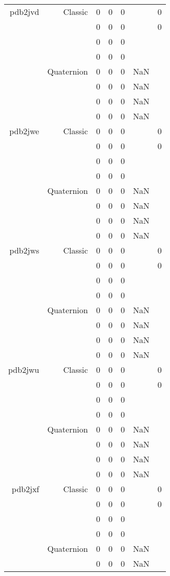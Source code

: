 \begin{xltabular}{\textwidth}{r|rcccSc}
pdb2jvd & Classic & 0 & 0 & 0 & & 0 \\
& & 0 & 0 & 0 & & 0 \\
& & 0 & 0 & 0 & & \\
& & 0 & 0 & 0 & & \\
& Quaternion & 0 & 0 & 0 & NaN & \\
& & 0 & 0 & 0 & NaN & \\
& & 0 & 0 & 0 & NaN & \\
& & 0 & 0 & 0 & NaN & \\ \addlinespace
pdb2jwe & Classic & 0 & 0 & 0 & & 0 \\
& & 0 & 0 & 0 & & 0 \\
& & 0 & 0 & 0 & & \\
& & 0 & 0 & 0 & & \\
& Quaternion & 0 & 0 & 0 & NaN & \\
& & 0 & 0 & 0 & NaN & \\
& & 0 & 0 & 0 & NaN & \\
& & 0 & 0 & 0 & NaN & \\ \addlinespace
pdb2jws & Classic & 0 & 0 & 0 & & 0 \\
& & 0 & 0 & 0 & & 0 \\
& & 0 & 0 & 0 & & \\
& & 0 & 0 & 0 & & \\
& Quaternion & 0 & 0 & 0 & NaN & \\
& & 0 & 0 & 0 & NaN & \\
& & 0 & 0 & 0 & NaN & \\
& & 0 & 0 & 0 & NaN & \\ \addlinespace
pdb2jwu & Classic & 0 & 0 & 0 & & 0 \\
& & 0 & 0 & 0 & & 0 \\
& & 0 & 0 & 0 & & \\
& & 0 & 0 & 0 & & \\
& Quaternion & 0 & 0 & 0 & NaN & \\
& & 0 & 0 & 0 & NaN & \\
& & 0 & 0 & 0 & NaN & \\
& & 0 & 0 & 0 & NaN & \\ \addlinespace
pdb2jxf & Classic & 0 & 0 & 0 & & 0 \\
& & 0 & 0 & 0 & & 0 \\
& & 0 & 0 & 0 & & \\
& & 0 & 0 & 0 & & \\
& Quaternion & 0 & 0 & 0 & NaN & \\
& & 0 & 0 & 0 & NaN & \\

\end{xltabular}
